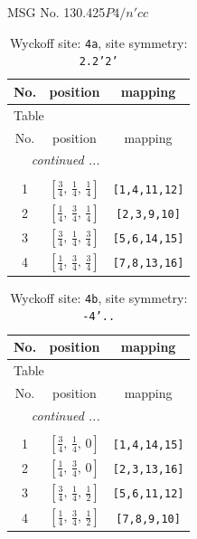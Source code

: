 \documentclass[fleqn,8pt]{jsarticle}
\begin{document}
\setcounter{MaxMatrixCols}{32}

\renewcommand{\tablename}{Table~}
\renewcommand{\figurename}{Figure~}
\begin{center}
\LARGE
MSG No. 130.425\quad$P4/n'cc$
\end{center}
\renewcommand{\arraystretch}{1.2}
\begin{longtable}{ccc}
\caption{Wyckoff site: {\tt 4a}, site symmetry: {\tt 2.2'2'}}
 \\
 \hline \hline
No. & position & mapping \\ \hline \endfirsthead

\multicolumn{2}{l}{\tablename\ \thetable{}} \\
 \hline \hline
No. & position & mapping \\ \hline \endhead

 \hline \hline
\multicolumn{2}{r}{\footnotesize\it continued ...} \\ \endfoot

 \hline \hline
\multicolumn{2}{r}{} \\ \endlastfoot

1 & $\left[ \frac{3}{4},\, \frac{1}{4},\, \frac{1}{4} \right]$ & {\tt [1,4,11,12]} \\ \hline
2 & $\left[ \frac{1}{4},\, \frac{3}{4},\, \frac{1}{4} \right]$ & {\tt [2,3,9,10]} \\ \hline
3 & $\left[ \frac{3}{4},\, \frac{1}{4},\, \frac{3}{4} \right]$ & {\tt [5,6,14,15]} \\ \hline
4 & $\left[ \frac{1}{4},\, \frac{3}{4},\, \frac{3}{4} \right]$ & {\tt [7,8,13,16]} \\
\end{longtable}
\renewcommand{\arraystretch}{1.2}
\begin{longtable}{ccc}
\caption{Wyckoff site: {\tt 4b}, site symmetry: {\tt -4'..}}
 \\
 \hline \hline
No. & position & mapping \\ \hline \endfirsthead

\multicolumn{2}{l}{\tablename\ \thetable{}} \\
 \hline \hline
No. & position & mapping \\ \hline \endhead

 \hline \hline
\multicolumn{2}{r}{\footnotesize\it continued ...} \\ \endfoot

 \hline \hline
\multicolumn{2}{r}{} \\ \endlastfoot

1 & $\left[ \frac{3}{4},\, \frac{1}{4},\, 0 \right]$ & {\tt [1,4,14,15]} \\ \hline
2 & $\left[ \frac{1}{4},\, \frac{3}{4},\, 0 \right]$ & {\tt [2,3,13,16]} \\ \hline
3 & $\left[ \frac{3}{4},\, \frac{1}{4},\, \frac{1}{2} \right]$ & {\tt [5,6,11,12]} \\ \hline
4 & $\left[ \frac{1}{4},\, \frac{3}{4},\, \frac{1}{2} \right]$ & {\tt [7,8,9,10]} \\
\end{longtable}
\end{document}
